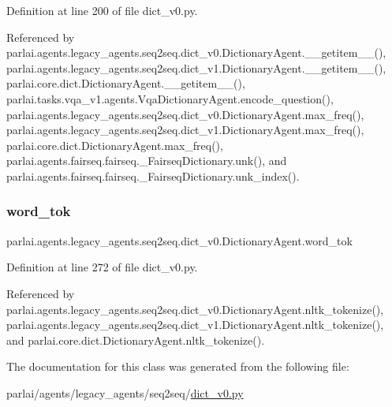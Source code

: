 Definition at line 200 of file dict\+\_\+v0.\+py.



Referenced by parlai.\+agents.\+legacy\+\_\+agents.\+seq2seq.\+dict\+\_\+v0.\+Dictionary\+Agent.\+\_\+\+\_\+getitem\+\_\+\+\_\+(), parlai.\+agents.\+legacy\+\_\+agents.\+seq2seq.\+dict\+\_\+v1.\+Dictionary\+Agent.\+\_\+\+\_\+getitem\+\_\+\+\_\+(), parlai.\+core.\+dict.\+Dictionary\+Agent.\+\_\+\+\_\+getitem\+\_\+\+\_\+(), parlai.\+tasks.\+vqa\+\_\+v1.\+agents.\+Vqa\+Dictionary\+Agent.\+encode\+\_\+question(), parlai.\+agents.\+legacy\+\_\+agents.\+seq2seq.\+dict\+\_\+v0.\+Dictionary\+Agent.\+max\+\_\+freq(), parlai.\+agents.\+legacy\+\_\+agents.\+seq2seq.\+dict\+\_\+v1.\+Dictionary\+Agent.\+max\+\_\+freq(), parlai.\+core.\+dict.\+Dictionary\+Agent.\+max\+\_\+freq(), parlai.\+agents.\+fairseq.\+fairseq.\+\_\+\+Fairseq\+Dictionary.\+unk(), and parlai.\+agents.\+fairseq.\+fairseq.\+\_\+\+Fairseq\+Dictionary.\+unk\+\_\+index().

\mbox{\label{classparlai_1_1agents_1_1legacy__agents_1_1seq2seq_1_1dict__v0_1_1DictionaryAgent_a215e7e8d345964e28c65849541979876}} 
\subsubsection{\texorpdfstring{word\+\_\+tok}{word\_tok}}
{\footnotesize\ttfamily parlai.\+agents.\+legacy\+\_\+agents.\+seq2seq.\+dict\+\_\+v0.\+Dictionary\+Agent.\+word\+\_\+tok}



Definition at line 272 of file dict\+\_\+v0.\+py.



Referenced by parlai.\+agents.\+legacy\+\_\+agents.\+seq2seq.\+dict\+\_\+v0.\+Dictionary\+Agent.\+nltk\+\_\+tokenize(), parlai.\+agents.\+legacy\+\_\+agents.\+seq2seq.\+dict\+\_\+v1.\+Dictionary\+Agent.\+nltk\+\_\+tokenize(), and parlai.\+core.\+dict.\+Dictionary\+Agent.\+nltk\+\_\+tokenize().



The documentation for this class was generated from the following file\+:\begin{DoxyCompactItemize}
\item 
parlai/agents/legacy\+\_\+agents/seq2seq/\hyperlink{dict__v0_8py}{dict\+\_\+v0.\+py}\end{DoxyCompactItemize}
